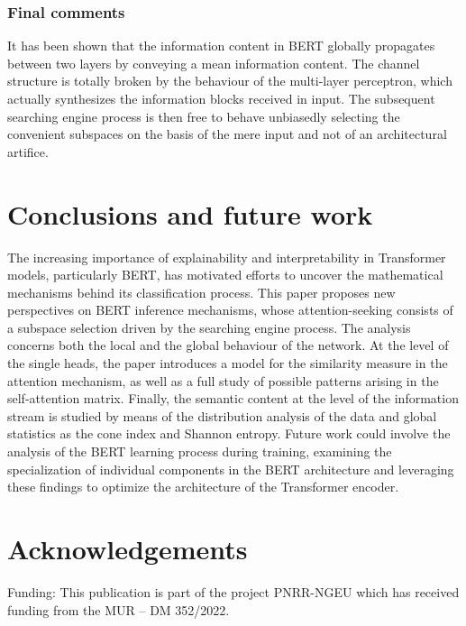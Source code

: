 \documentclass[11pt,a4paper,reqno]{amsart} %
\theoremstyle{definition}
\numberwithin{equation}{section}          %
\begin{document}
\subsubsection{Final comments}

It has been shown that the information content in BERT globally propagates between two layers by conveying a mean information content. The channel structure is totally broken by the behaviour of the multi-layer perceptron, which actually synthesizes the information blocks received in input. The subsequent searching engine process is then free to behave unbiasedly selecting the convenient subspaces on the basis of the mere input and not of an architectural artifice.


\section{Conclusions and future work}
The increasing importance of explainability and interpretability in Transformer models, particularly BERT, has motivated efforts to uncover the mathematical mechanisms behind its classification process.
This paper proposes new perspectives on BERT inference mechanisms, whose attention-seeking consists of a subspace selection driven by the searching engine process. The analysis concerns both the local and the global behaviour of the network. At the level of the single heads, the paper introduces a model for the similarity measure in the attention mechanism, as well as a full study of possible patterns arising in the self-attention matrix. Finally, the semantic content at the level of the information stream is studied by means of the distribution analysis of the data and global statistics as the cone index and Shannon entropy.
Future work could involve the analysis of the BERT learning process during training, examining the specialization of individual components in the BERT architecture and leveraging these findings to optimize the architecture of the Transformer encoder.

\section{Acknowledgements}
Funding: This publication is part of the project PNRR-NGEU which has received funding from the MUR – DM 352/2022.

  
 
\end{document}

